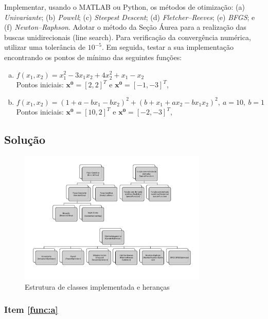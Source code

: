 \documentclass[10pt, a4paper]{article}
\begin{document}
Implementar, usando o MATLAB ou Python, os métodos de otimização: (a) \textit{Univariante}; (b) \textit{Powell}; (c) \textit{Steepest Descent}; 
(d) \textit{Fletcher–Reeves}; (e) \textit{BFGS}; e (f) \textit{Newton–Raphson}. Adotar o método da Seção Áurea para a realização das buscas unidirecionais
(line search). Para verificação da convergência numérica, utilizar uma tolerância de $10^{-5}$. Em seguida, testar a sua implementação encontrando os pontos
de mínimo das seguintes funções:

\begin{enumerate}[(a)]
  \item $f(x_1, x_2) = x_1^2 - 3x_1x_2 + 4x_2^2 + x_1 - x_2$ \\
        Pontos iniciais: $\mathbf{x^0} = [2, 2]^T$ e $\mathbf{x^0} = [-1, -3]^T$, \label{func:a}
  \item $f(x_1, x_2) = (1 + a - bx_1 - bx_2)^2 + (b + x_1 + ax_2 - bx_1x_2)^2, \ a = 10, \ b = 1$ \\
        Pontos iniciais: $\mathbf{x^0} = [10, 2]^T$ e $\mathbf{x^0} = [-2, -3]^T$, \label{func:b}
\end{enumerate}

\subsection{Solução}

\begin{figure}[htpb]
  \centering
  \includegraphics[width=0.8\textwidth]{../general/classes_full.pdf}
  \caption{Estrutura de classes implementada e heranças}
  \label{fig:q1_1}
\end{figure}

\subsubsection{Item \ref{func:a}}
\end{document}
